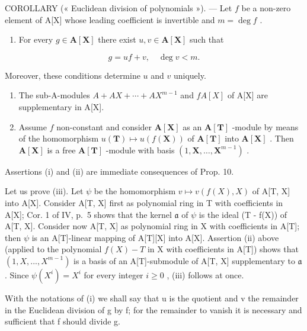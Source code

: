 COROLLARY (« Euclidean division of polynomials »). --- Let \(f\) be a non-zero element of A{[}X{]} whose leading coefficient is invertible and \(m = \deg f\) .

\begin{enumerate}
\def\labelenumi{(\roman{enumi})}
\tightlist
\item
  For every \(g \in \mathbf{A}[\mathbf{X}]\) there exist \(u, v \in \mathbf{A}[\mathbf{X}]\) such that
\end{enumerate}

\[
g = u f + v, \quad \deg v <   m.
\]

Moreover, these conditions determine \(u\) and \(v\) uniquely.

\begin{enumerate}
\def\labelenumi{(\roman{enumi})}
\setcounter{enumi}{1}
\item
  The sub-A-modules \(A + AX + \cdots + AX^{m-1}\) and \(fA[X]\) of A{[}X{]} are supplementary in A{[}X{]}.
\item
  Assume \(f\) non-constant and consider \(\mathbf{A}[\mathbf{X}]\) as an \(\mathbf{A}[\mathbf{T}]\) -module by means of the homomorphism \(u(\mathbf{T}) \mapsto u(f(\mathbf{X}))\) of \(\mathbf{A}[\mathbf{T}]\) into \(\mathbf{A}[\mathbf{X}]\) . Then \(\mathbf{A}[\mathbf{X}]\) is a free \(\mathbf{A}[\mathbf{T}]\) -module with basis \((1, \mathbf{X}, \ldots, \mathbf{X}^{m-1})\) .
\end{enumerate}

Assertions (i) and (ii) are immediate consequences of Prop. 10.

Let us prove (iii). Let \(\psi\) be the homomorphism \(v \mapsto v(f(X), X)\) of A{[}T, X{]} into A{[}X{]}. Consider A{[}T, X{]} first as polynomial ring in T with coefficients in A{[}X{]}; Cor. 1 of IV, p.~5 shows that the kernel \(\mathfrak{a}\) of \(\psi\) is the ideal (T - f(X)) of A{[}T, X{]}. Consider now A{[}T, X{]} as polynomial ring in X with coefficients in A{[}T{]}; then \(\psi\) is an A{[}T{]}-linear mapping of A{[}T{]}{[}X{]} into A{[}X{]}. Assertion (ii) above (applied to the polynomial \(f(X) - T\) in X with coefficients in A{[}T{]}) shows that \((1, X, ..., X^{m-1})\) is a basis of an A{[}T{]}-submodule of A{[}T, X{]} supplementary to \(\mathfrak{a}\) . Since \(\psi(X^i) = X^i\) for every integer \(i \geqslant 0\) , (iii) follows at once.

With the notations of (i) we shall say that u is the quotient and v the remainder in the Euclidean division of g by f; for the remainder to vanish it is necessary and sufficient that f should divide g.

